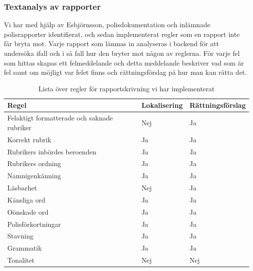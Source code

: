 \documentclass[swedish]{maucsthesis}
\begin{document}
\subsubsection{Textanalys av rapporter}\label{textanalysavrapporter}

Vi har med hjälp av Esbjörnsson, polisdokumentation och inlämnade polisrapporter identifierat, och sedan implementerat
regler som en rapport inte får bryta mot. Varje rapport som lämnas in analyseras i backend för att undersöka
ifall och i så fall hur den bryter mot någon av reglerna.
För varje fel som hittas skapas ett felmeddelande och detta meddelande beskriver vad som är fel
samt om möjligt var felet finns och rättningsförslag på hur man kan rätta det.

\begin{table}[H]
\centering
\begin{tabular}{|l|l|l|}
\hline
Regel                                       & Lokalisering & Rättningsförslag\\ \hline
Felaktigt formatterade och saknade rubriker & Nej          & Ja               \\ \hline
Korrekt rubrik                              & Ja           & Ja               \\ \hline
Rubrikers inbördes beroenden                 & Ja           & Ja               \\ \hline
Rubrikers ordning                           & Ja           & Ja               \\ \hline
Namnigenkänning                             & Ja           & Ja               \\ \hline
Läsbarhet                                   & Nej          & Ja               \\ \hline
Känsliga ord                                & Ja           & Ja               \\ \hline
Oönskade ord                                & Ja           & Ja               \\ \hline
Polisförkortningar                          & Ja           & Ja               \\ \hline
Stavning                                    & Ja           & Ja               \\ \hline
Grammatik                                   & Ja           & Ja               \\ \hline
Tonalitet                                   & Nej          & Nej              \\ \hline
\end{tabular}
\caption{Lista över regler för rapportskrivning vi har implementerat}
\label{rulestable}
\end{table}
\end{document}
